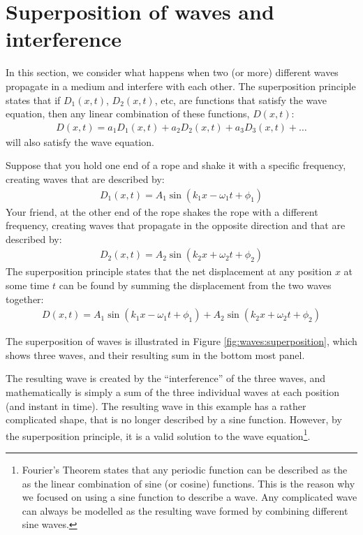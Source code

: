 \section{Superposition of waves and interference}
In this section, we consider what happens when two (or more) different waves propagate in a medium and interfere with each other. The superposition principle states that if $D_1(x,t)$, $D_2(x,t)$, etc, are functions that satisfy the wave equation, then any linear combination of these functions, $D(x,t)$:
\begin{align*}
D(x,t) = a_1D_1(x,t)+a_2D_2(x,t)+a_3D_3(x,t)+\dots
\end{align*}
will also satisfy the wave equation.

Suppose that you hold one end of a rope and shake it with a specific frequency, creating waves that are described by:
\begin{align*}
D_1(x,t) = A_1\sin(k_1x-\omega_1t+\phi_1)
\end{align*}
Your friend, at the other end of the rope shakes the rope with a different frequency, creating waves that propagate in the opposite direction and that are described by:
\begin{align*}
D_2(x,t) = A_2\sin(k_2x+\omega_2t+\phi_2)
\end{align*}
The superposition principle states that the net displacement at any position $x$ at some time $t$ can be found by summing the displacement from the two waves together:
\begin{align*}
D(x,t) = A_1\sin(k_1x-\omega_1t+\phi_1) + A_2\sin(k_2x+\omega_2t+\phi_2)
\end{align*}

The superposition of waves is illustrated in Figure \ref{fig:waves:superposition}, which shows three waves, and their resulting sum in the bottom most panel.

The resulting wave is created by the ``interference'' of the three waves, and mathematically is simply a sum of the three individual waves at each position (and instant in time). The resulting wave in this example has a rather complicated shape, that is no longer described by a sine function. However, by the superposition principle, it is a valid solution to the wave equation\footnote{Fourier's Theorem states that any periodic function can be described as the as the linear combination of sine (or cosine) functions. This is the reason why we focused on using a sine function to describe a wave. Any complicated wave can always be modelled as the resulting wave formed by combining different sine waves.}.

